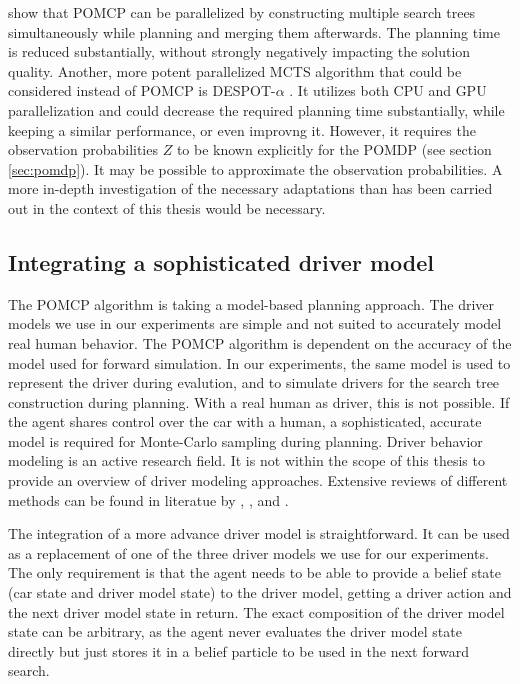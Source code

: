 \cite{pomcp-parallel} show that POMCP can be parallelized by constructing multiple search trees simultaneously while planning and merging them afterwards. The planning time is reduced substantially, without strongly negatively impacting the solution quality. Another, more potent parallelized MCTS algorithm that could be considered instead of POMCP is DESPOT-$\alpha$ \parencite{despot-a}. It utilizes both CPU and GPU parallelization and could decrease the required planning time substantially, while keeping a similar performance, or even improvng it. However, it requires the observation probabilities $Z$ to be known explicitly for the POMDP (see section \ref{sec:pomdp}). It may be possible to approximate the observation probabilities. A more in-depth investigation of the necessary adaptations than has been carried out in the context of this thesis would be necessary.

\subsection{Integrating a sophisticated driver model}
\label{sec:complex-driver}

The POMCP algorithm is taking a model-based planning approach. The driver models we use in our experiments are simple and not suited to accurately model real human behavior. The POMCP algorithm is dependent on the accuracy of the model used for forward simulation. In our experiments, the same model is used to represent the driver during evalution, and to simulate drivers for the search tree construction during planning. With a real human as driver, this is not possible. If the agent shares control over the car with a human, a sophisticated, accurate model is required for Monte-Carlo sampling during planning. Driver behavior modeling is an active research field. It is not within the scope of this thesis to provide an overview of driver modeling approaches. Extensive reviews of different methods can be found in literatue by \cite{model-review-3}, \cite{model-review-4}, and \cite{model-review-5}.

The integration of a more advance driver model is straightforward. It can be used as a replacement of one of the three driver models we use for our experiments. The only requirement is that the agent needs to be able to provide a belief state (car state and driver model state) to the driver model, getting a driver action and the next driver model state in return. The exact composition of the driver model state can be arbitrary, as the agent never evaluates the driver model state directly but just stores it in a belief particle to be used in the next forward search.


